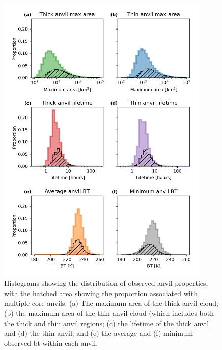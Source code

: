 \begin{figure}[tp]
    \centering
    \includegraphics[width=0.9\textwidth]{figures/chapter2_20.png}
    \caption[
    Histograms showing the distribution of observed anvil properties
    ]{
    Histograms showing the distribution of observed anvil properties, with the hatched area showing the proportion associated with multiple core anvils. (a) The maximum area of the thick anvil cloud; (b) the maximum area of the thin anvil cloud (which includes both the thick and thin anvil regions; (c) the lifetime of the thick anvil and (d) the thin anvil; and (e) the average and (f) minimum observed \acrshort{bt} within each anvil.
    }
    \label{fig:anvil_properties}
\end{figure}

